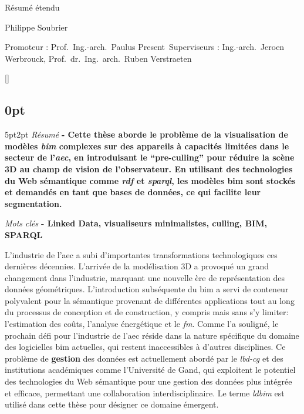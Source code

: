 \begin{center}
    \sffamily
    \huge Résumé étendu

    \Large Philippe Soubrier

    \normalsize
    Promoteur : Prof.\ Ing.-arch.\ Paulus Present\
    Superviseurs : Ing.-arch.\ Jeroen Werbrouck, Prof.\ dr.\ Ing.\ arch.\ Ruben Verstraeten
\end{center}
\begin{refsection}
    []{}
    \begin{multicols}{2}
        \small
        \titlespacing\subsection{0pt}{5pt}{2pt}
        \emph{Résumé} \textbf{
            - Cette thèse aborde le problème de la visualisation de modèles \emph{\ac{bim}} complexes sur des appareils à capacités limitées dans le secteur de l'\emph{\ac{aec}}, en introduisant le \enquote{pre-culling} pour réduire la scène 3D au champ de vision de l'observateur. En utilisant des technologies du Web sémantique comme \emph{\ac{rdf}} et \emph{\ac{sparql}}, les modèles \ac{bim} sont stockés et demandés en tant que bases de données, ce qui facilite leur segmentation.
        }

        \emph{Mots clés} \textbf{
            - Linked Data, visualiseurs minimalistes, culling, BIM, SPARQL
        }

        L'industrie de l'\ac{aec} a subi d'importantes transformations technologiques ces dernières décennies. L'arrivée de la modélisation 3D a provoqué un grand changement dans l'industrie, marquant une nouvelle ère de représentation des données géométriques. L'introduction subséquente du \ac{bim} a servi de conteneur polyvalent pour la sémantique provenant de différentes applications tout au long du processus de conception et de construction, y compris mais sans s'y limiter: l'estimation des coûts, l'analyse énergétique et le \emph{\ac{fm}}. Comme \cite{Werbrouck2018} l'a souligné, le prochain défi pour l'industrie de l'\ac{aec} réside dans la nature spécifique du domaine des logicielles \ac{bim} actuelles, qui restent inaccessibles à d'autres disciplines. Ce problème de \textbf{gestion} des données est actuellement abordé par le \emph{\ac{lbd-cg}} et des institutions académiques comme l'Université de Gand, qui exploitent le potentiel des technologies du Web sémantique pour une gestion des données plus intégrée et efficace, permettant une collaboration interdisciplinaire. Le terme \emph{\ac{ldbim}} est utilisé dans cette thèse pour désigner ce domaine émergent.


\end{multicols}
\end{refsection}
